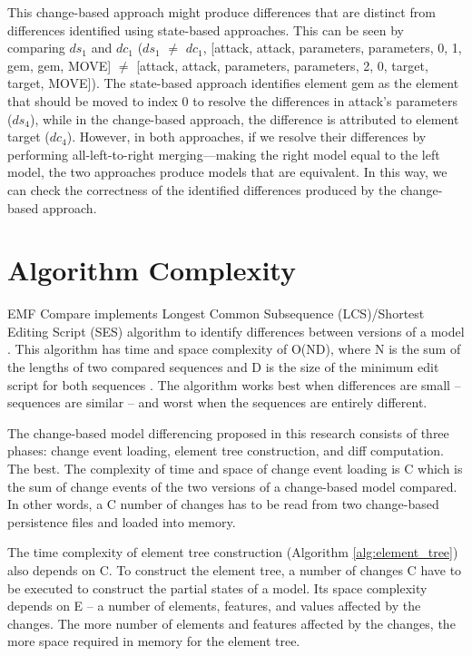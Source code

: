 This change-based approach might produce differences that are distinct from differences identified using state-based approaches. This can be seen by comparing $ds_{1}$ and $dc_{1}$ ($ds_{1}$ $\neq$ $dc_{1}$, [\textsf{attack}, \textsf{attack}, \textsf{parameters}, \textsf{parameters}, 0, 1, \textsf{gem}, \textsf{gem}, \textsf{MOVE}] $\neq$ [\textsf{attack}, \textsf{attack}, \textsf{parameters}, \textsf{parameters}, 2, 0, \textsf{target}, \textsf{target}, \textsf{MOVE}]). The state-based approach identifies element \textsf{gem} as the element that should be moved to index 0 to resolve the differences in \textsf{attack}’s \textsf{parameters} ($ds_{4}$), while in the change-based approach, the difference is attributed to element \textsf{target} ($dc_{4}$). However, in both approaches, if we resolve their differences by performing all-left-to-right merging—making the right model equal to the left model, the two approaches produce models that are equivalent. In this way, we can check the correctness of the identified differences produced by the change-based approach.

\section{Algorithm Complexity}
\label{sec:differencing_algorithm_complexity}
EMF Compare implements Longest Common Subsequence (LCS)/Shortest Editing Script (SES) algorithm to identify differences between versions of a model \cite{emfcompare2018developer}. This algorithm has time and space complexity of \textsf{O}(\textsf{ND}), where \textsf{N} is the sum of the lengths of two compared sequences and \textsf{D} is the size of the minimum edit script for both sequences \cite{DBLP:journals/algorithmica/Meyers86}. The algorithm works best when differences are small -- sequences are similar -- and worst when the sequences are entirely different.

The change-based model differencing proposed in this research consists of three phases: change event loading, element tree construction, and diff computation. The best. The complexity of time and space of change event loading is \textsf{C} which is the sum of change events of the two versions of a change-based model compared. In other words, a \textsf{C} number of changes has to be read from two change-based persistence files and loaded into memory.
 
The time complexity of element tree construction (Algorithm \ref{alg:element_tree}) also depends on \textsf{C}. To construct the element tree, a number of changes \textsf{C} have to be executed to construct the partial states of a model. Its space complexity depends on \textsf{E} -- a number of elements, features, and values affected by the changes. The more number of elements and features affected by the changes, the more space required in memory for the element tree.

